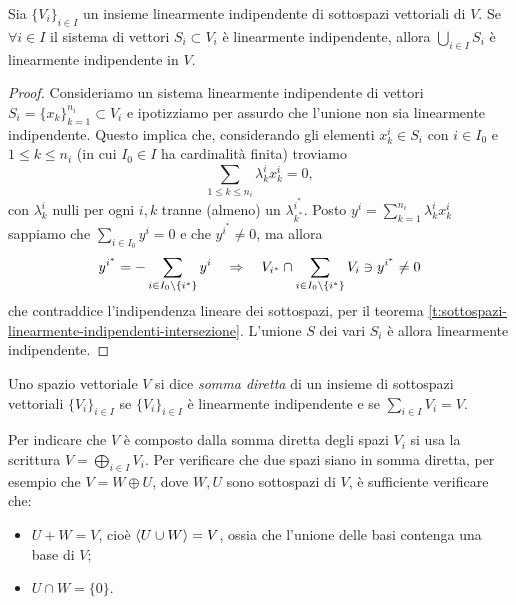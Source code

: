 \begin{teorema} \label{t:unione-sottospazi-linearmente-indipendente}
	Sia $\{V_i\}_{i\in I}$ un insieme linearmente indipendente di sottospazi vettoriali di $V$.
	Se $\forall i\in I$ il sistema di vettori $S_i\subset V_i$ è linearmente indipendente, allora $\bigcup_{i\in I}S_i$ è linearmente indipendente in $V$.
\end{teorema}
\begin{proof}
	Consideriamo un sistema linearmente indipendente di vettori $S_i=\{x_k\}_{k=1}^{n_i}\subset V_i$ e ipotizziamo per assurdo che l'unione non sia linearmente indipendente.
	Questo implica che, considerando gli elementi $x_k^i\in S_i$ con $i\in I_0$ e $1\le k\le n_i$ (in cui $I_0\in I$ ha cardinalità finita) troviamo 
	\begin{equation*}
		\sum_{1\leq k \leq n_i}\lambda_k^ix_k^i = 0,
	\end{equation*}
	con $\lambda_k^i$ nulli per ogni $i,k$ tranne (almeno) un $\lambda_{k^*}^{i^*}$.
	Posto $y^i=\sum_{k=1}^{n_i}\lambda_k^ix_k^i$ sappiamo che $\sum_{i\in I_0}y^i=0$ e che $y^{i^*}\ne 0$, ma allora
	\begin{equation*}
		y^{i^*}=-\sum_{i\in I_0\setminus\{i^*\}}y^i\quad\Rightarrow\quad V_{i^*}\cap\sum_{i\in I_0\setminus\{i^*\}}V_i\ni y^{i^*}\ne 0
	\end{equation*}
	che contraddice l'indipendenza lineare dei sottospazi, per il teorema \ref{t:sottospazi-linearmente-indipendenti-intersezione}.
	L'unione $S$ dei vari $S_i$ è allora linearmente indipendente. 
\end{proof}

\begin{definizione} \label{d:somma-diretta}
	Uno spazio vettoriale $V$ si dice \emph{somma diretta} di un insieme di sottospazi vettoriali $\{V_i\}_{i\in I}$ se $\{V_i\}_{i\in I}$ è linearmente indipendente e se $\sum_{i\in I}V_i=V$.
\end{definizione}
Per indicare che $V$ è composto dalla somma diretta degli spazi $V_i$ si usa la scrittura $V=\bigoplus_{i\in I}V_i$.
Per verificare che due spazi siano in somma diretta, per esempio che $V=W\oplus U$, dove $W,U$ sono sottospazi di $V$, è sufficiente verificare che:
\begin{itemize}
	\item $U+W=V$, cioè $\left\langle{U\cup W}\right\rangle=V$, ossia che l'unione delle basi contenga una base di $V$;
	\item $U\cap W=\{0\}$.
\end{itemize}
